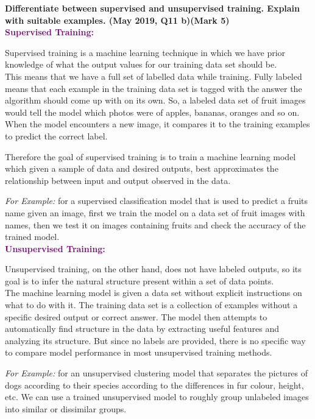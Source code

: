 
\textbf{\textcolor{LightMagenta}{Differentiate between supervised and unsupervised training. Explain with suitable examples. (May 2019, Q11 b)\hfill (Mark 5)}} \\[5pt]
\textbf{\textcolor{purple}{Supervised Training:} }

    Supervised training is a machine learning technique in which we have prior knowledge of what the output values for our training data set should be. \\
    This means that we have a full set of labelled data while training.
    Fully labeled means that each example in the training data set is tagged with the answer the algorithm should come up with on its own. So, a labeled data set of fruit images would tell the model which photos were of apples, bananas, oranges and so on. When the model encounters a new image, it compares it to the training examples to predict the correct label.
    
    Therefore the goal of supervised training is to train a machine learning model which given a sample of data and desired outputs, best approximates the relationship between input and output observed in the data.
    
    \textit{For Example:} for a supervised classification model that is used to predict a fruits name given an image, first we train the model on a data set of fruit images with names, then we test it on images containing fruits and check the accuracy of the trained model.
    \newline \\
\textbf{\textcolor{purple}{Unsupervised Training:} }
    
    Unsupervised training, on the other hand, does not have labeled outputs, so its goal is to infer the natural structure present within a set of data points.\\
    The machine learning model is given a data set without explicit instructions on what to do with it. The training data set is a collection of examples without a specific desired output or correct answer. The model then attempts to automatically find structure in the data by extracting useful features and analyzing its structure.
    But since no labels are provided, there is no specific way to compare model performance in most unsupervised training methods.
    
    \textit{For Example:} for an unsupervised clustering model that separates the pictures of dogs according to their species according to the differences in fur colour, height, etc. We can use a trained unsupervised model to roughly group unlabeled images into similar or dissimilar groups.


